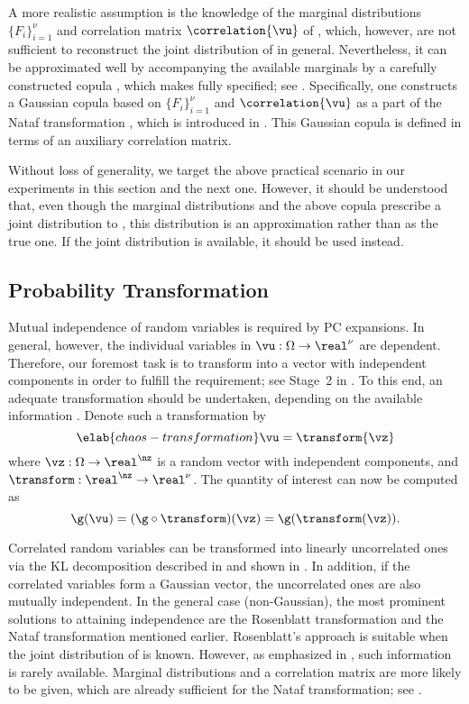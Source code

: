 A more realistic assumption is the knowledge of the marginal distributions $\{
F_i \}_{i = 1}^\nu$ and correlation matrix $\correlation{\vu}$ of \vu, which,
however, are not sufficient to reconstruct the joint distribution of \vu in
general. Nevertheless, it can be approximated well by accompanying the available
marginals by a carefully constructed copula \cite{nelsen2006}, which makes \vu
fully specified; see . Specifically, one constructs a
Gaussian copula based on $\{ F_i \}_{i = 1}^\nu$ and $\correlation{\vu}$ as a
part of the Nataf transformation \cite{liu1986}, which is introduced in
. This Gaussian copula is defined in terms of
an auxiliary correlation matrix.

Without loss of generality, we target the above practical scenario in our
experiments in this section and the next one. However, it should be understood
that, even though the marginal distributions and the above copula prescribe a
joint distribution to \vu, this distribution is an approximation rather than as
the true one. If the joint distribution is available, it should be used instead.

\subsection{Probability Transformation}

Mutual independence of random variables is required by \ac{PC} expansions. In
general, however, the individual variables in $\vu: \Omega \to \real^\nu$ are
dependent. Therefore, our foremost task is to transform \vu into a vector with
independent components in order to fulfill the requirement; see Stage~2 in
. To this end, an adequate transformation should be
undertaken, depending on the available information \cite{eldred2008}. Denote
such a transformation by
\begin{equation} \elab{chaos-transformation}
  \vu = \transform{\vz}
\end{equation}
where $\vz: \Omega \to \real^\nz$ is a random vector with \nz independent
components, and $\transform: \real^\nz \to \real^\nu$. The quantity of interest
\g can now be computed as
\[
  \g(\vu) = (\g \circ \transform)(\vz) = \g(\transform(\vz)).
\]

Correlated random variables can be transformed into linearly uncorrelated ones
via the \ac{KL} decomposition described in  and
shown in . In addition, if the correlated variables form a
Gaussian vector, the uncorrelated ones are also mutually independent. In the
general case (non-Gaussian), the most prominent solutions to attaining
independence are the Rosenblatt transformation \cite{rosenblatt1952} and the
Nataf transformation mentioned earlier. Rosenblatt's approach is suitable when
the joint distribution of \vu is known. However, as emphasized in
, such information is rarely available. Marginal
distributions and a correlation matrix are more likely to be given, which are
already sufficient for the Nataf transformation; see
.

